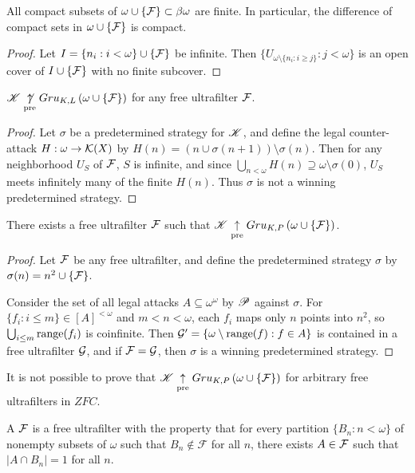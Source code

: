 \begin{lem}
  All compact subsets of $\omega\cup\{\mathcal{F}\}\subset\beta\omega$ are finite.
  In particular, the difference of compact sets in $\omega\cup\{\mathcal{F}\}$
  is compact.
\end{lem}

\begin{proof}
  Let $I=\{n_i:i<\omega\}\cup\{\mathcal{F}\}$ be infinite.
  Then $\{U_{\omega\setminus\{n_i:i\geq j\}}:j<\omega\}$ is an open cover of
  $I\cup\{\mathcal{F}\}$ with no finite subcover.
\end{proof}

\begin{thm}
  $\mathscr{K}\underset{\text{pre}}{\not\uparrow} Gru_{K,L}\left({\omega\cup\{\mathcal{F}\}}\right)$ for any free
  ultrafilter $\mathcal{F}$.
\end{thm}

\begin{proof}
  Let $\sigma$ be a predetermined strategy for $\mathscr{K}$, and define the legal
  counter-attack $H:\omega\to\mathcal{K}(X)$ by
  $H(n)=(n\cup\sigma(n+1))\setminus\sigma(n)$. Then for any neighborhood
  $U_S$ of $\mathcal{F}$, $S$ is infinite, and since
  $\bigcup_{n<\omega} H(n)\supseteq\omega\setminus\sigma(0)$, $U_S$ meets
  infinitely many of the finite $H(n)$. Thus $\sigma$ is not a winning
  predetermined strategy.
\end{proof}

\begin{thm}
  There exists a free ultrafilter $\mathcal{F}$ such that
  $\mathscr{K}\underset{\text{pre}}{\uparrow} Gru_{K,P}\left({\omega\cup\{\mathcal{F}\}}\right)$.
\end{thm}

\begin{proof}
  Let $\mathcal{F}$ be any free ultrafilter, and
  define the predetermined strategy $\sigma$ by
  $\sigma(n)=n^2\cup\{\mathcal{F}\}$.

  Consider the set of all legal attacks $A\subseteq\omega^\omega$ by
  $\mathscr{P}$ against $\sigma$. For $\{f_i:i\leq m\}\in [A]^{<\omega}$ and
  $m<n<\omega$, each $f_i$ maps only $n$ points into $n^2$, so
  $\bigcup_{i\leq m}\text{range}(f_i)$ is coinfinite.
  Then $\mathcal{G}'=\{\omega\setminus\text{range}(f) : f\in A\}$ is contained in a free
  ultrafilter $\mathcal{G}$, and if $\mathcal{F}=\mathcal{G}$, then $\sigma$ is a
  winning predetermined strategy.
\end{proof}

It is not possible to prove that $\mathscr{K}\underset{\text{pre}}{\uparrow} Gru_{K,P}\left({\omega\cup\{\mathcal{F}\}}\right)$
for arbitrary free ultrafilters in $ZFC$.

\begin{defn}
  A  $\mathcal{F}$ is a free ultrafilter with the
  property that for every
  partition $\{B_n : n < \omega\}$ of nonempty subsets of $\omega$ such that
  $B_n \not\in \mathcal{F}$ for all $n$, there exists $A \in \mathcal{F}$ such
  that $|A \cap B_n|=1$ for all $n$.
\end{defn}


